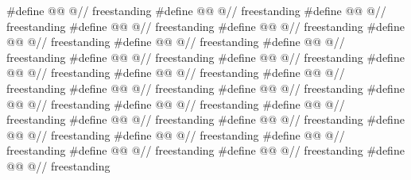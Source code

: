 \begin{codeblock}
#define @@ @\seebelow@                                                // freestanding
#define @@ @\seebelow@                                               // freestanding
#define @@ @\seebelow@                                                  // freestanding
#define @@ @\seebelow@                                              // freestanding
#define @@ @\seebelow@                                               // freestanding
#define @@ @\seebelow@                                                // freestanding
#define @@ @\seebelow@                                               // freestanding
#define @@ @\seebelow@                                               // freestanding
#define @@ @\seebelow@                                             // freestanding
#define @@ @\seebelow@                                         // freestanding
#define @@ @\seebelow@                                             // freestanding
#define @@ @\seebelow@                                            // freestanding
#define @@ @\seebelow@                                          // freestanding
#define @@ @\seebelow@                                               // freestanding
#define @@ @\seebelow@                                              // freestanding
#define @@ @\seebelow@                                               // freestanding
#define @@ @\seebelow@                                               // freestanding
#define @@ @\seebelow@                                              // freestanding
#define @@ @\seebelow@                                               // freestanding
#define @@ @\seebelow@                                              // freestanding
#define @@ @\seebelow@                                               // freestanding
#define @@ @\seebelow@                                               // freestanding
#define @@ @\seebelow@                                          // freestanding
#define @@ @\seebelow@                                               // freestanding
#define @@ @\seebelow@                                               // freestanding
#define @@ @\seebelow@                                             // freestanding

\end{codeblock}
